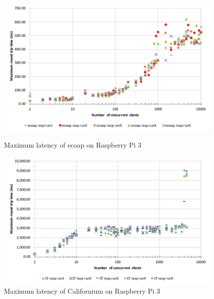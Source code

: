 \begin{figure}[!htbp]
\centering
\includegraphics[scale = 0.7]{ecoap_max_latency_rasp}
\caption{Maximum latency of ecoap on Raspberry Pi 3}
\label{fig:ecoap_max_latency_rasp}
\includegraphics[scale = 0.7]{californium_max_latency_rasp}
\caption{Maximum latency of Californium on Raspberry Pi 3}
\label{fig:californium_max_latency_rasp}
\end{figure}

